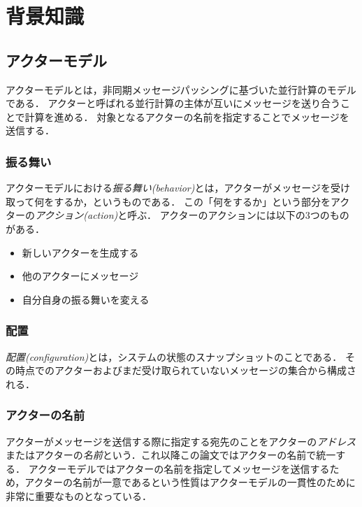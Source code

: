 \chapter{背景知識}
\label{chapter:background}

\section{アクターモデル}

アクターモデル\cite{Agha:1986aa}とは，非同期メッセージパッシングに基づいた並行計算のモデルである．
アクターと呼ばれる並行計算の主体が互いにメッセージを送り合うことで計算を進める．
対象となるアクターの名前を指定することでメッセージを送信する．


\subsection{振る舞い}

アクターモデルにおける\emph{振る舞い(behavior)}とは，アクターがメッセージを受け取って何をするか，というものである．
この「何をするか」という部分をアクターの\emph{アクション(action)}と呼ぶ．
アクターのアクションには以下の3つのものがある．

\begin{itemize}
\item 新しいアクターを生成する
\item 他のアクターにメッセージ
\item 自分自身の振る舞いを変える
\end{itemize}


\subsection{配置}

\emph{配置(configuration)}とは，システムの状態のスナップショットのことである．
その時点でのアクターおよびまだ受け取られていないメッセージの集合から構成される．

\subsection{アクターの名前}

アクターがメッセージを送信する際に指定する宛先のことをアクターの\emph{アドレス}またはアクターの\emph{名前}という．これ以降この論文ではアクターの名前で統一する．
アクターモデルではアクターの名前を指定してメッセージを送信するため，アクターの名前が一意であるという性質はアクターモデルの一貫性のために非常に重要なものとなっている．

